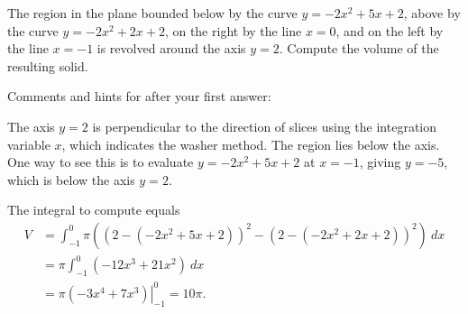 \documentclass{ximera}
\begin{document}
\begin{question}%

The region in the plane bounded below by the curve \(y=-2x^2+5x+2\), above by the curve \(y=-2x^2+2x+2\), on the right by the line  \(x = 0\), and on the left by the line \(x = -1\) is revolved around the axis \(y = 2\). Compute the volume of the resulting solid.
\begin{multiplechoice}
\choice[correct]{\(10\pi\)}
\choice{\(14\pi\)}
\choice{\(18\pi\)}
\choice{\(22\pi\)}
\choice{\(26\pi\)}
\choice{\(30\pi\)}
\end{multiplechoice}
Comments and hints for after your first answer:
\begin{feedback}
The axis \(y = 2\) is perpendicular to the direction of slices using the integration variable \(x\), which indicates the washer method. 
 The region lies below the axis. One way to see this is to evaluate \(y=-2x^2+5x+2\) at \(x = -1\), giving \(y = -5\), which is below the axis \(y = 2\).
 \begin{hint}
The integral to compute equals \[ \begin{aligned} V &= \int_{-1}^{0}\pi \left((2-(-2x^2+5x+2))^2 - (2-(-2x^2+2x+2))^2\right)~ dx\\
& = \pi \int_{-1}^{0} (-12x^3+21x^2)~ dx\\
& = \pi \left. \left(-3x^4+7x^3\right) \right|_{-1}^{0} = 10\pi. \end{aligned}\]
\end{hint}
\end{feedback}

\end{question}
\end{document}
